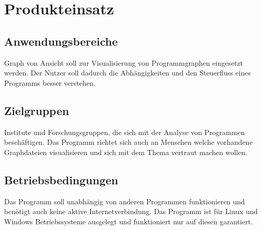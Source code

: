 \chapter{Produkteinsatz}

\section{Anwendungsbereiche}
Graph von Ansicht soll zur Visualisierung von Programmgraphen eingesetzt werden. Der Nutzer soll dadurch die Abhängigkeiten und den Steuerfluss eines Programms besser verstehen.
\section{Zielgruppen}
Institute und Forschungsgruppen, die sich mit der Analyse von Programmen beschäftigen. Das Programm richtet sich auch an Menschen welche vorhandene Graphdateien visualisieren und sich mit dem Thema vertraut machen wollen.

\section{Betriebsbedingungen}
Das Programm soll unabhängig von anderen Programmen funktionieren und benötigt auch keine aktive Internetverbindung. Das Programm ist für Linux und Windows Betriebssysteme ausgelegt und funktioniert nur auf diesen garantiert.